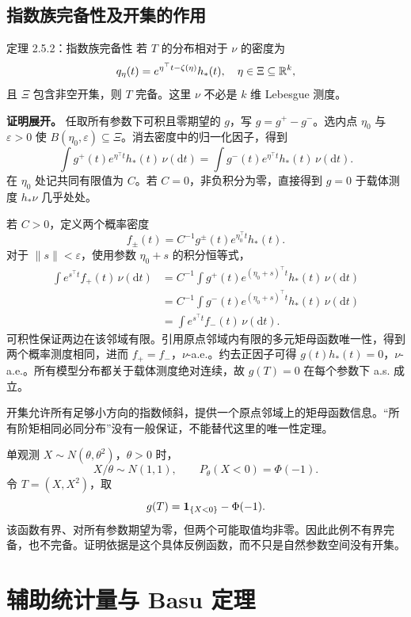 \subsection{指数族完备性及开集的作用}
\begin{definitionbox}{定理 2.5.2：指数族完备性}
若 $T$ 的分布相对于 $\nu$ 的密度为
\[
 q_\eta(t)=e^{\eta^\top t-\zeta(\eta)}h_*(t),\quad\eta\in\Xi\subseteq\mathbb R^k,
\]
且 $\Xi$ 包含非空开集，则 $T$ 完备。这里 $\nu$ 不必是 $k$ 维 Lebesgue 测度。
\end{definitionbox}

\textbf{证明展开。} 任取所有参数下可积且零期望的 $g$，写 $g=g^+-g^-$。选内点 $\eta_0$ 与 $\varepsilon>0$ 使 $B(\eta_0,\varepsilon)\subseteq\Xi$。消去密度中的归一化因子，得到
\[
 \int g^+(t)e^{\eta^\top t}h_*(t)\,\nu(\mathrm dt)
 =\int g^-(t)e^{\eta^\top t}h_*(t)\,\nu(\mathrm dt).
\]
在 $\eta_0$ 处记共同有限值为 $C$。若 $C=0$，非负积分为零，直接得到 $g=0$ 于载体测度 $h_*\nu$ 几乎处处。

若 $C>0$，定义两个概率密度
\[
 f_\pm(t)=C^{-1}g^\pm(t)e^{\eta_0^\top t}h_*(t).
\]
对于 $\|s\|<\varepsilon$，使用参数 $\eta_0+s$ 的积分恒等式，
\[
 \begin{aligned}
 \int e^{s^\top t}f_+(t)\,\nu(\mathrm dt)
 &=C^{-1}\int g^+(t)e^{(\eta_0+s)^\top t}h_*(t)\,\nu(\mathrm dt)\\
 &=C^{-1}\int g^-(t)e^{(\eta_0+s)^\top t}h_*(t)\,\nu(\mathrm dt)\\
 &=\int e^{s^\top t}f_-(t)\,\nu(\mathrm dt).
 \end{aligned}
\]
可积性保证两边在该邻域有限。引用原点邻域内有限的多元矩母函数唯一性，得到两个概率测度相同，进而 $f_+=f_-$，$\nu$-a.e.。约去正因子可得 $g(t)h_*(t)=0$，$\nu$-a.e.。所有模型分布都关于载体测度绝对连续，故 $g(T)=0$ 在每个参数下 a.s. 成立。

开集允许所有足够小方向的指数倾斜，提供一个原点邻域上的矩母函数信息。“所有阶矩相同必同分布”没有一般保证，不能替代这里的唯一性定理。

\begin{notebox}[弯曲族的不完备必须另证]
单观测 $X\sim N(\theta,\theta^2)$，$\theta>0$ 时，
\[
 X/\theta\sim N(1,1),\qquad P_\theta(X<0)=\Phi(-1).
\]
令 $T=(X,X^2)$，取
\[
 g(T)=\mathbf 1_{\{X<0\}}-\Phi(-1).
\]
该函数有界、对所有参数期望为零，但两个可能取值均非零。因此此例不有界完备，也不完备。证明依据是这个具体反例函数，而不只是自然参数空间没有开集。
\end{notebox}

\section{辅助统计量与 Basu 定理}

